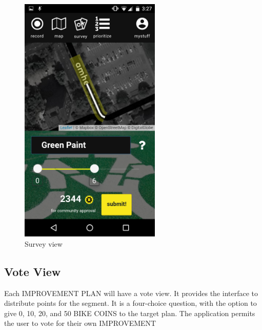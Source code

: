 \begin{figure}[!htb]
  \includegraphics[width=0.6\textwidth]{chapters/4/fig/interface_solution2.png}               
  \caption[interface: Survey]{Survey view}
  \label{fig:interface_improvment}
\end{figure}

\subsection{Vote View}

Each IMPROVEMENT PLAN will have a vote view. It provides the interface to distribute points for the segment. It is a four-choice question, with the option to give 0, 10, 20, and 50 BIKE COINS to the target plan. The application permits the user to vote for their own IMPROVEMENT

